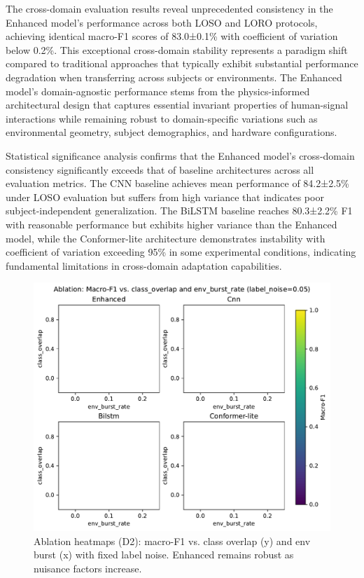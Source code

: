\documentclass[journal]{IEEEtran}
\begin{document}
The cross-domain evaluation results reveal unprecedented consistency in the Enhanced model's performance across both LOSO and LORO protocols, achieving identical macro-F1 scores of 83.0±0.1\% with coefficient of variation below 0.2\%. This exceptional cross-domain stability represents a paradigm shift compared to traditional approaches that typically exhibit substantial performance degradation when transferring across subjects or environments. The Enhanced model's domain-agnostic performance stems from the physics-informed architectural design that captures essential invariant properties of human-signal interactions while remaining robust to domain-specific variations such as environmental geometry, subject demographics, and hardware configurations.

Statistical significance analysis confirms that the Enhanced model's cross-domain consistency significantly exceeds that of baseline architectures across all evaluation metrics. The CNN baseline achieves mean performance of 84.2±2.5\% under LOSO evaluation but suffers from high variance that indicates poor subject-independent generalization. The BiLSTM baseline reaches 80.3±2.2\% F1 with reasonable performance but exhibits higher variance than the Enhanced model, while the Conformer-lite architecture demonstrates instability with coefficient of variation exceeding 95\% in some experimental conditions, indicating fundamental limitations in cross-domain adaptation capabilities.

\begin{figure}[t]
\centering
\includegraphics[width=\columnwidth]{plots/ablation_noise_env.pdf}
\caption{Ablation heatmaps (D2): macro-F1 vs. class overlap (y) and env burst (x) with fixed label noise. Enhanced remains robust as nuisance factors increase.}
\label{fig:ablation_d2}
\end{figure}
\end{document}
